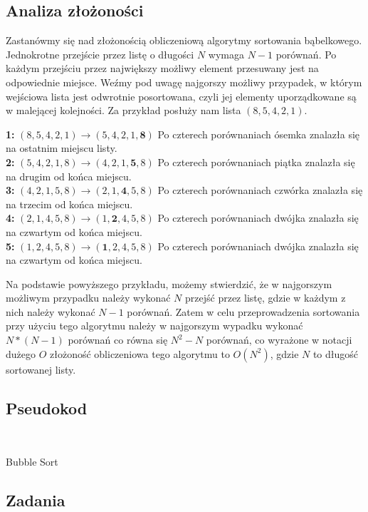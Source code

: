 \documentclass[knowledge.tex]{subfiles}
\begin{document}
    \subsection*{Analiza złożoności}
    Zastanówmy się nad złożonością obliczeniową algorytmy sortowania bąbelkowego. Jednokrotne przejście przez listę o długości $N$ wymaga $N - 1$ porównań. Po każdym przejściu przez największy możliwy element przesuwany jest na odpowiednie miejsce. Weźmy pod uwagę najgorszy możliwy przypadek, w którym wejściowa lista jest odwrotnie posortowana, czyli jej elementy uporządkowane są w malejącej kolejności. Za przykład posłuży nam lista $( 8, 5, 4, 2, 1 )$.
    \begin{addmargin}[2em]{0em}
        \textbf{1:} $( 8, 5, 4, 2, 1 ) \rightarrow ( 5, 4, 2, 1, \textbf{8} )$ Po czterech porównaniach ósemka znalazła się na ostatnim miejscu listy.\\[0.1cm]
        \textbf{2:} $( 5,4,2,1,8 ) \rightarrow ( 4, 2, 1, \textbf{5}, 8 )$ Po czterech porównaniach piątka znalazła się na drugim od końca miejscu.\\[0.1cm]
        \textbf{3:} $( 4, 2, 1, 5, 8 ) \rightarrow ( 2, 1, \textbf{4}, 5, 8 )$ Po czterech porównaniach czwórka znalazła się na trzecim od końca miejscu.\\[0.1cm]
        \textbf{4:} $( 2, 1, 4, 5, 8 ) \rightarrow ( 1, \textbf{2}, 4, 5, 8 )$ Po czterech porównaniach dwójka znalazła się na czwartym od końca miejscu.\\[0.1cm]
        \textbf{5:} $( 1, 2, 4, 5, 8 ) \rightarrow ( \textbf{1}, 2, 4, 5, 8 )$ Po czterech porównaniach dwójka znalazła się na czwartym od końca miejscu.
    \end{addmargin}
    Na podstawie powyższego przykładu, możemy stwierdzić, że w najgorszym możliwym przypadku należy wykonać $N$ przejść przez listę, gdzie w każdym z nich należy wykonać $N - 1$ porównań. Zatem w celu przeprowadzenia sortowania przy użyciu tego algorytmu należy w najgorszym wypadku wykonać $N * (N - 1)$ porównań co równa się $N^2 - N$ porównań, co wyrażone w notacji dużego $O$ złożoność obliczeniowa tego algorytmu to $O(N^2)$, gdzie $N$ to długość sortowanej listy.
    
    \subsection*{Pseudokod}
    \begin{algorithm}[H]

    \\[0.3cm]
    
    \For{n \textbf{in} [0; N)} {
        \For{i \textbf{in} [0; N - 1)}{
            \If{values[$i$] \textbf{greater than} values[$i + 1$]}{
                swap(values[$i$], values[$i+1$])
            }
        }
    }
    \caption{Bubble Sort}
\end{algorithm}

\subsection*{Zadania}


   
\end{document}
